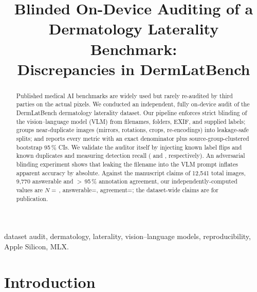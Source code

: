 \documentclass[conference]{IEEEtran}
\begin{document}
\title{Blinded On-Device Auditing of a Dermatology Laterality Benchmark:\\
Discrepancies in DermLatBench}

\author{
}

\maketitle

\begin{abstract}
Published medical AI benchmarks are widely used but rarely re-audited by third
parties on the actual pixels. We conducted an independent, fully on-device audit
of the DermLatBench dermatology laterality dataset. Our pipeline enforces strict
blinding of the vision--language model (VLM) from filenames, folders, EXIF, and
supplied labels; groups near-duplicate images (mirrors, rotations, crops,
re-encodings) into leakage-safe splits; and reports every metric with an exact
denominator plus source-group-clustered bootstrap 95\,\% CIs. We validate the
auditor itself by injecting \InjLabelKnown{} known label flips and
\InjDupKnown{} known duplicates and measuring detection recall
(\InjLabelRecall{} and \InjDupRecall{}, respectively). An adversarial
blinding experiment shows that leaking the filename into the VLM prompt
inflates apparent accuracy by \BlindingInflation{} absolute. Against the
manuscript claims of 12{,}541 total images, 9{,}770 answerable and $>$\,95\,\%
annotation agreement, our independently-computed values are
$N=$\,\NTotal{}, answerable=\NAnswerable{}, agreement=\SuppliedAgreement{};
the dataset-wide claims are \ReadyOrNot{} for publication.
\end{abstract}

\begin{IEEEkeywords}
dataset audit, dermatology, laterality, vision--language models, reproducibility,
Apple Silicon, MLX.
\end{IEEEkeywords}

\section{Introduction}
\end{document}
